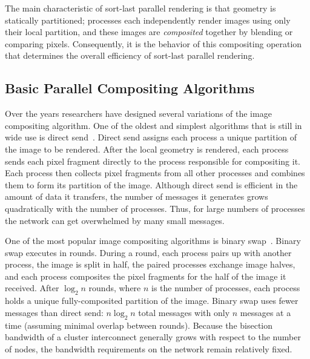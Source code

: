 \documentclass{sig-alternate}
\newcommand*{\lcite}[1]{~\cite{#1}}
\newcommand*{\keyterm}[1]{\emph{#1}}
\begin{document}
The main characteristic of sort-last parallel rendering is that geometry
is statically partitioned; processes each independently render images using
only their local partition, and these images are \keyterm{composited}
together by blending or comparing pixels.  Consequently, it is the behavior
of this compositing operation that determines the overall efficiency of
sort-last parallel rendering.

\subsection{Basic Parallel Compositing Algorithms}
\label{sec:BasicParallelCompositingAlgorithms}

Over the years researchers have designed several variations of the image
compositing algorithm.  One of the oldest and simplest algorithms that is
still in wide use is direct send\lcite{DirectSend1,DirectSend2}.  Direct
send assigns each process a unique partition of the image to be rendered.
After the local geometry is rendered, each process sends each pixel
fragment directly to the process responsible for compositing it.  Each
process then collects pixel fragments from all other processes and combines
them to form its partition of the image.  Although direct send is efficient
in the amount of data it transfers, the number of messages it generates
grows quadratically with the number of processes.  Thus, for large numbers
of processes the network can get overwhelmed by many small messages.

One of the most popular image compositing algorithms is binary
swap\lcite{BinarySwap1,BinarySwap2}.  Binary swap executes in rounds.
During a round, each process pairs up with another process, the image is
split in half, the paired processes exchange image halves, and each process
composites the pixel fragments for the half of the image it received.
After $\log_{2} n$ rounds, where $n$ is the number of processes, each
process holds a unique fully-composited partition of the image.  Binary
swap uses fewer messages than direct send: $n \log_{2} n$ total messages
with only $n$ messages at a time (assuming minimal overlap between
rounds).  Because the bisection bandwidth of a cluster interconnect
generally grows with respect to the number of nodes, the bandwidth
requirements on the network remain relatively fixed.
\end{document}
